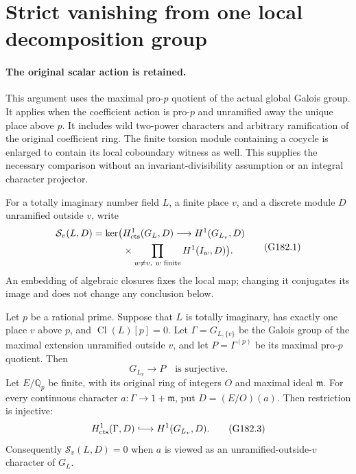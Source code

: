 \section{Strict vanishing from one local decomposition group}
\label{sec:one-prime-proell-original-strict}

\paragraph{The original scalar action is retained.}
This argument uses the maximal pro-$p$ quotient of the actual global
Galois group.  It applies when the coefficient action is pro-$p$ and
unramified away the unique place above $p$.
It includes wild two-power characters and arbitrary ramification of
the original coefficient ring.  The finite torsion module containing
a cocycle is enlarged to contain its local coboundary witness as well.
This supplies the necessary comparison without an invariant-divisibility
assumption or an integral character projector.

For a totally imaginary number field $L$, a finite place $v$, and a
discrete module $D$ unramified outside $v$, write
\[
 \begin{split}
 \mathcal S_v(L,D)=\ker\bigl(&H^1_{\rm cts}(G_L,D)
       \longrightarrow H^1(G_{L_v},D)\\
       &\times\prod_{w\ne v,\ w\text{ finite}}H^1(I_w,D)\bigr).
 \end{split}\tag{G182.1}
\]
An embedding of algebraic closures fixes the local map; changing it
conjugates its image and does not change any conclusion below.

\begin{lemma}
\label{G182-one-prime-lemma}
Let $p$ be a rational prime.  Suppose that $L$ is totally imaginary,
has exactly one place $v$ above $p$, and
$\operatorname{Cl}(L)[p]=0$.
Let $\Gamma=G_{L,\{v\}}$ be the Galois group of the maximal extension
unramified outside $v$, and let $P=\Gamma^{(p)}$ be its maximal
pro-$p$ quotient.  Then
\[
                  G_{L_v}\longrightarrow P
                       \quad\text{is surjective}.
 \tag{G182.2}
\]
Let $E/\mathbb Q_p$ be finite, with its original ring of integers $O$
and maximal ideal $\mathfrak m$.  For every continuous character
$a:\Gamma\to1+\mathfrak m$, put $D=(E/O)(a)$.
Then restriction is injective:
\[
 H^1_{\rm cts}(\Gamma,D)\lhook\joinrel\longrightarrow
                      H^1(G_{L_v},D).
 \tag{G182.3}
\]
Consequently $\mathcal S_v(L,D)=0$ when $a$ is viewed as an
unramified-outside-$v$ character of $G_L$.
\end{lemma}

